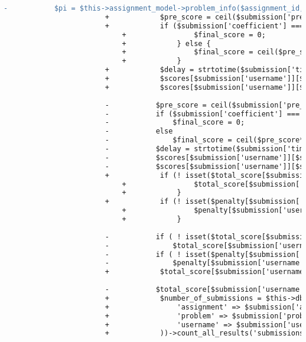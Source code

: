 \begin{lstlisting}[language=diff, caption=Perubahan pada kode Scoreboard\_model.php]
						-			$pi = $this->assignment_model->problem_info($assignment_id, $submission['problem']);
						+            $pre_score = ceil($submission['pre_score'] * $pi['score'] / 10000);
						+            if ($submission['coefficient'] === 'error') {
							+                $final_score = 0;
							+            } else {
							+                $final_score = ceil($pre_score * $submission['coefficient'] / 100);
							+            }
						+            $delay = strtotime($submission['time']) - $start;
						+            $scores[$submission['username']][$submission['problem']]['score'] = $final_score;
						+            $scores[$submission['username']][$submission['problem']]['time'] = $delay;
						
						-			$pre_score = ceil($submission['pre_score']*$pi['score']/10000);
						-			if ($submission['coefficient'] === 'error')
						-				$final_score = 0;
						-			else
						-				$final_score = ceil($pre_score*$submission['coefficient']/100);
						-			$delay = strtotime($submission['time'])-$start;
						-			$scores[$submission['username']][$submission['problem']]['score'] = $final_score;
						-			$scores[$submission['username']][$submission['problem']]['time'] = $delay;
						+            if (! isset($total_score[$submission['username']])) {
							+                $total_score[$submission['username']] = 0;
							+            }
						+            if (! isset($penalty[$submission['username']])) {
							+                $penalty[$submission['username']] = 0;
							+            }
						
						-			if ( ! isset($total_score[$submission['username']]))
						-				$total_score[$submission['username']] = 0;
						-			if ( ! isset($penalty[$submission['username']]))
						-				$penalty[$submission['username']] = 0;
						+            $total_score[$submission['username']] += $final_score;
						
						-			$total_score[$submission['username']] += $final_score;
						+            $number_of_submissions = $this->db->where(array(
						+                'assignment' => $submission['assignment'],
						+                'problem' => $submission['problem'],
						+                'username' => $submission['username'],
						+            ))->count_all_results('submissions');
						

\end{lstlisting}

